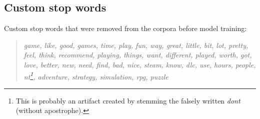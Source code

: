 \documentclass[11pt, a4paper]{article}
\newenvironment{itquote}
  {\begin{quote}\itshape}
  {\end{quote}\ignorespacesafterend}
\begin{document}
\clearpage

\nocite{*}
\printbibliography

\clearpage

\begin{appendices}
\section{Custom stop words}\label{sec:stops}
Custom stop words that were removed from the corpora before model training:
\begin{itquote}
    game, like, good, games, time, play, fun, way, great, little, bit, lot, pretty, feel, think, recommend, playing,
    things, want, different, played, worth, got, love, better, new, need, find, bad, nice, steam, know, dlc, use, hours,
    people, nt\footnote{This is probably an artifact created by stemming the falsely written \textit{dont} (without
    apostrophe).}, adventure, strategy, simulation, rpg, puzzle
\end{itquote}
\end{appendices}
\end{document}
